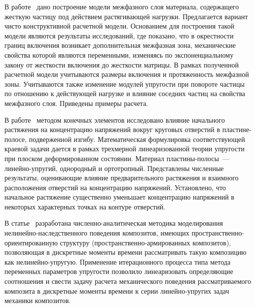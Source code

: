 В работе~\cite{Dudchenko} дано построение модели межфазного слоя материала, содержащего жесткую частицу под действием растягивающей нагрузки. Предлагается вариант чисто конструктивной расчетной модели. Основанием для построения такой модели являются результаты исследований, где показано, что в окрестности границ включения возникает дополнительная межфазная зона, механические свойства которой являются переменными, изменяясь по экспоненциальному закону от жесткости включения до жесткости матрицы. В рамках полученной расчетной модели учитываются размеры включения и протяженность межфазной зоны. Учитываются также изменение модулей упругости при повороте частицы по отношению к действующей нагрузке и влияние соседних частиц на свойства межфазного слоя. Приведены примеры расчета.


В работе~\cite{Akbarov} методом конечных элементов исследовано влияние начального растяжения на концентрацию напряжений вокруг круговых отверстий в пластине-полосе, подверженной изгибу. Математическая формулировка соответствующей краевой задачи дается в рамках трехмерной линеаризованной теории упругости при плоском деформированном состоянии. Материал пластины-полосы~--- линейно-упругий, однородный и ортотропный. Представлены численные результаты, оценивающие влияние предварительного растяжения и взаимного расположения отверстий на концентрацию напряжений. Установлено, что начальное растяжение существенно уменьшает концентрацию напряжений в некоторых характерных точках на контуре отверстий.

В статье~\cite{Yankovskiy} разработана численно-аналитическая методика моделирования нелинейно-наследственного поведения композитов, имеющих про\-стран\-ст\-ве\-н\-но-ори\-ен\-ти\-ро\-ва\-н\-ную структуру (пространственно-армированных композитов), позволяющая в дискретные моменты времени рассматривать такую композицию как не\-ли\-ней\-но-уп\-ру\-гую. Применение итерационного процесса типа метода переменных параметров упругости позволило линеаризовать определяющие соотношения и свести задачу расчета механического поведения рассматриваемого композита в дискретные моменты времени к серии ли\-ней\-но-уп\-ру\-гих задач механики композитов. 

